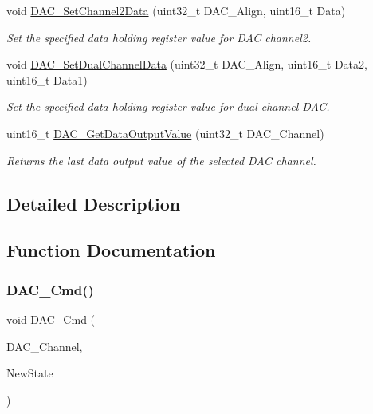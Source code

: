 \begin{DoxyCompactItemize}
void \mbox{\hyperlink{group___d_a_c___exported___functions_ga44e12006ec186791378d132da8541552}{D\+A\+C\+\_\+\+Set\+Channel2\+Data}} (uint32\+\_\+t D\+A\+C\+\_\+\+Align, uint16\+\_\+t Data)
\begin{DoxyCompactList}\small\item\em Set the specified data holding register value for D\+AC channel2. \end{DoxyCompactList}\item 
void \mbox{\hyperlink{group___d_a_c___exported___functions_ga4ca2cfdf56ab35a23f2517f23d7fbb24}{D\+A\+C\+\_\+\+Set\+Dual\+Channel\+Data}} (uint32\+\_\+t D\+A\+C\+\_\+\+Align, uint16\+\_\+t Data2, uint16\+\_\+t Data1)
\begin{DoxyCompactList}\small\item\em Set the specified data holding register value for dual channel D\+AC. \end{DoxyCompactList}\item 
uint16\+\_\+t \mbox{\hyperlink{group___d_a_c___exported___functions_ga51274838de1e5dd012a82d7f44d7a50b}{D\+A\+C\+\_\+\+Get\+Data\+Output\+Value}} (uint32\+\_\+t D\+A\+C\+\_\+\+Channel)
\begin{DoxyCompactList}\small\item\em Returns the last data output value of the selected D\+AC channel. \end{DoxyCompactList}\end{DoxyCompactItemize}


\subsection{Detailed Description}


\subsection{Function Documentation}
\mbox{\label{group___d_a_c___exported___functions_ga323e61530d7fa9396c3bce9edb61f733}} 
\subsubsection{\texorpdfstring{DAC\_Cmd()}{DAC\_Cmd()}}
{\footnotesize\ttfamily void D\+A\+C\+\_\+\+Cmd (\begin{DoxyParamCaption}\item[{uint32\+\_\+t}]{D\+A\+C\+\_\+\+Channel,  }\item[{\mbox{\hyperlink{group___exported__types_gac9a7e9a35d2513ec15c3b537aaa4fba1}{Functional\+State}}}]{New\+State }\end{DoxyParamCaption})}



